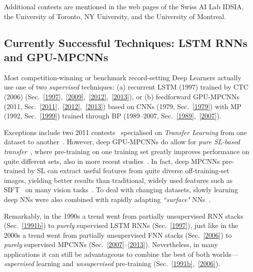 \documentclass[letterpaper]{article}
\begin{document}
\begin{CJK*}{UTF8}{gbsn}
\begin{sloppypar}
Additional contests are mentioned in the web pages of
the Swiss AI Lab IDSIA,
the University of Toronto,
NY University,
and the University of Montreal.


\subsection{Currently Successful Techniques: LSTM RNNs and GPU-MPCNNs}
\label{dominant}

Most competition-winning or benchmark record-setting Deep Learners actually use one of two {\em supervised} techniques: (a) recurrent LSTM (1997)  trained by CTC (2006) (Sec.~\ref{1997},~\ref{2009},~\ref{2012},~\ref{2013}), or (b) 
 feedforward GPU-MPCNNs (2011, Sec.~\ref{2011},~\ref{2012},~\ref{2013})
based on CNNs (1979, Sec.~\ref{1979}) with MP (1992, Sec.~\ref{1999}) 
trained through BP (1989--2007, Sec.~\ref{1989},~\ref{2007}).

Exceptions include two 2011 contests~\citep{goodfellow2011,transfer2011,goodfellow:2012icml} specialised on {\em Transfer 
Learning} from one dataset to another~\citep[e.g.,][]{caruana1997,Schmidhuber:04oops,transfer2010}.
However, deep GPU-MPCNNs do allow for {\em pure SL-based transfer}~\citep{Ciresan:2012a}, 
where pre-training
on one training set greatly improves performance on quite different sets,
also in more recent studies~\citep{oquab2013,donahue2013}. 
In fact, deep MPCNNs pre-trained by SL  can extract useful 
features from quite diverse off-training-set images, yielding better results than traditional, 
widely used features 
such as SIFT~\citep{Lowe:1999,Lowe:04} on many vision tasks~\citep{razavian2014}.
To deal with changing datasets, 
slowly learning deep NNs were also combined with  
rapidly adapting {\em ``surface"} NNs~\citep{kak2010}.


Remarkably, 
in the 1990s a trend went from partially unsupervised RNN stacks (Sec.~\ref{1991b}) to {\em purely} supervised LSTM RNNs (Sec.~\ref{1997}), just like in the 2000s a trend went from partially unsupervised FNN stacks (Sec.~\ref{2006}) to {\em purely} supervised MPCNNs 
(Sec.~\ref{2007}--\ref{2013}).
Nevertheless, in many applications it can still be advantageous to combine the best of both worlds---{\em supervised} learning and {\em unsupervised} pre-training (Sec.~\ref{1991b},~\ref{2006}).




\end{sloppypar}
\end{CJK*}
\end{document}
